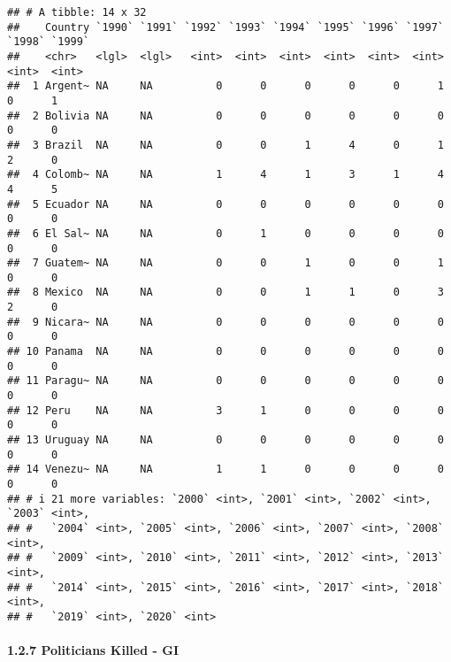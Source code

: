 \documentclass[
  11pt,
]{article}
\begin{document}
\begin{verbatim}
## # A tibble: 14 x 32
##    Country `1990` `1991` `1992` `1993` `1994` `1995` `1996` `1997` `1998` `1999`
##    <chr>   <lgl>  <lgl>   <int>  <int>  <int>  <int>  <int>  <int>  <int>  <int>
##  1 Argent~ NA     NA          0      0      0      0      0      1      0      1
##  2 Bolivia NA     NA          0      0      0      0      0      0      0      0
##  3 Brazil  NA     NA          0      0      1      4      0      1      2      0
##  4 Colomb~ NA     NA          1      4      1      3      1      4      4      5
##  5 Ecuador NA     NA          0      0      0      0      0      0      0      0
##  6 El Sal~ NA     NA          0      1      0      0      0      0      0      0
##  7 Guatem~ NA     NA          0      0      1      0      0      1      0      0
##  8 Mexico  NA     NA          0      0      1      1      0      3      2      0
##  9 Nicara~ NA     NA          0      0      0      0      0      0      0      0
## 10 Panama  NA     NA          0      0      0      0      0      0      0      0
## 11 Paragu~ NA     NA          0      0      0      0      0      0      0      0
## 12 Peru    NA     NA          3      1      0      0      0      0      0      0
## 13 Uruguay NA     NA          0      0      0      0      0      0      0      0
## 14 Venezu~ NA     NA          1      1      0      0      0      0      0      0
## # i 21 more variables: `2000` <int>, `2001` <int>, `2002` <int>, `2003` <int>,
## #   `2004` <int>, `2005` <int>, `2006` <int>, `2007` <int>, `2008` <int>,
## #   `2009` <int>, `2010` <int>, `2011` <int>, `2012` <int>, `2013` <int>,
## #   `2014` <int>, `2015` <int>, `2016` <int>, `2017` <int>, `2018` <int>,
## #   `2019` <int>, `2020` <int>
\end{verbatim}

\paragraph{1.2.7 Politicians Killed - GI}\label{politicians-killed---gi}
\end{document}
